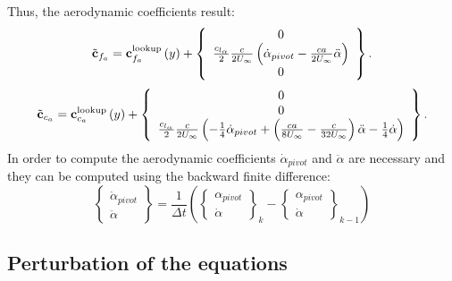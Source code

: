 Thus, the aerodynamic coefficients result:
\begin{equation}
	\tilde{\bm{\mathbf{c}}}_{f_{a}} = 
		\bm{\mathbf{c}}_{f_a}^\text{lookup}\left( y \right) +
		\left\{ \begin{array}{c} 
			0 \\
			\frac{c_{l_\alpha}}{2} \frac{c}{2 U_\infty} \left(  \dot{\alpha}_{pivot} - \frac{c a}{2 U_\infty} \ddot{\alpha} \right) \\ 
			0
		 \end{array} \right\}.
\end{equation}
\begin{equation}
	\tilde{\bm{\mathbf{c}}}_{c_{a}} = 
		\bm{\mathbf{c}}_{c_a}^\text{lookup}\left( y \right) + \left\{
		\begin{array}{c}
		0 \\ 0\\
		\frac{c_{l_\alpha}}{2} \frac{c}{2 U_\infty}
		 \left(  -\frac{1}{4} \dot{\alpha}_{pivot} +
		\left( \frac{ c a}{8 U_\infty} - \frac{c}{32 U_\infty}  \right) \ddot{\alpha}
		-\frac{1}{4} \dot{\alpha} \right)
		\end{array}
		\right\}.
\end{equation}
In order to compute the aerodynamic coefficients $\dot{\alpha}_{pivot}$ and $\ddot{\alpha}$ are
necessary and they can be computed using the backward finite difference:
\begin{equation}
\left\{
	\begin{array}{c}
		\dot{\alpha}_{pivot} \\
		\ddot{\alpha}
	\end{array}
\right\} = 
\frac{1}{\Delta t} \left(
\left\{
	\begin{array}{c}
		\alpha_{pivot} \\
		\dot{\alpha}
	\end{array}
\right\}_k - 
\left\{
	\begin{array}{c}
		\alpha_{pivot} \\
		\dot{\alpha}
	\end{array}
\right\}_{k-1}
\right)
\end{equation} 
\subsection{Perturbation of the equations}

